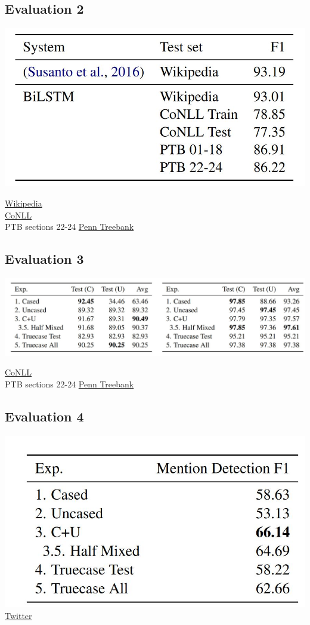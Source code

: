 \documentclass{article}
\begin{document}
\subsection*{Evaluation 2}
\includegraphics{stat2}

\noindent
\href{https://www.aclweb.org/anthology/W11-1601.pdf}{Wikipedia}\\
\href{https://dl.acm.org/doi/10.3115/1119176.1119195}{CoNLL}\\
PTB sections 22-24 \href{https://www.seas.upenn.edu/~pdtb/}{Penn Treebank}



\subsection*{Evaluation 3}
\includegraphics{stat3}

\noindent
\href{https://dl.acm.org/doi/10.3115/1119176.1119195}{CoNLL}\\
PTB sections 22-24 \href{https://www.seas.upenn.edu/~pdtb/}{Penn Treebank}


\subsection*{Evaluation 4}
\includegraphics{stat4}
\href{https://github.com/GateNLP/broad_twitter_corpus}{Twitter}
\end{document}

